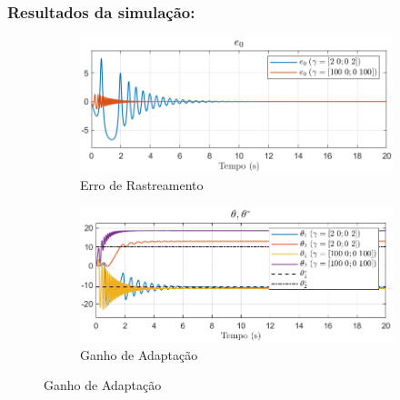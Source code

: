 \documentclass[10pt]{article}
\begin{document}
\subsubsection{Resultados da simulação:}

\begin{figure}[h!]
    \centering
    \begin{subfigure}[b]{0.3\textwidth}
        \centering
        \includegraphics[width=\textwidth]{img/fig07a.png}
        \caption{Erro de Rastreamento}
    \end{subfigure}
    \begin{subfigure}[b]{0.3\textwidth}
        \centering
        \includegraphics[width=\textwidth]{img/fig07b.png}
        \caption{Ganho de Adaptação}
    \end{subfigure}


\end{figure}
\end{document}
